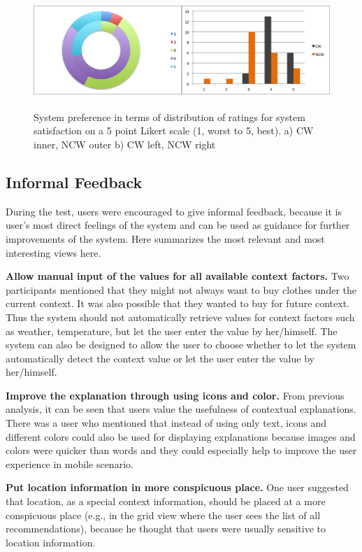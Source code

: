 \begin{figure}[H]
	\centering
	\includegraphics[height=1.7in]{figures/systemSatisfaction.png}
	\caption{System preference in terms of distribution of ratings for system satisfaction on a 5 point Likert scale (1, worst to 5, best). a) CW inner, NCW outer b) CW left, NCW right}
	\label{fig:systemSatisfaction}
\end{figure}

\subsection{Informal Feedback} \label{sec:results_if}

During the test, users were encouraged to give informal feedback, because it is user's most direct feelings of the system and can be used as guidance for further improvements of the system. Here summarizes the most relevant and most interesting views here.

\textbf{Allow manual input of the values for all available context factors.} Two participants mentioned that they might not always want to buy clothes under the current context. It was also possible that they wanted to buy for future context. Thus the system should not automatically retrieve values for context factors such as weather, temperature, but let the user enter the value by her/himself. The system can also be designed to allow the user to choose whether to let the system automatically detect the context value or let the user enter the value by her/himself.

\textbf{Improve the explanation through using icons and color.} From previous analysis, it can be seen that users value the usefulness of contextual explanations. There was a user who mentioned that instead of using only text, icons and different colors could also be used for displaying explanations because images and colors were quicker than words and they could especially help to improve the user experience in mobile scenario.
 
\textbf{Put location information in more conspicuous place.} One user suggested that location, as a special context information, should be placed at a more conspicuous place (e.g., in the grid view where the user sees the list of all recommendations), because he thought that users were usually sensitive to location information.  

